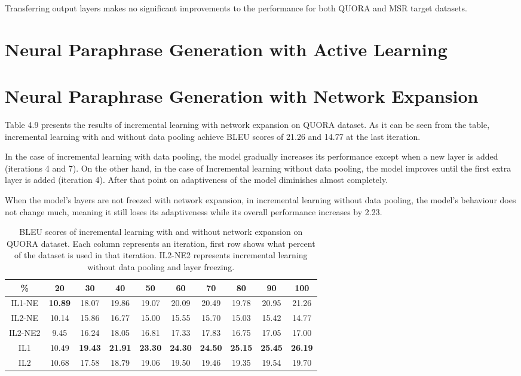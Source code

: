 Transferring output layers makes no significant improvements to the performance for both QUORA and MSR target datasets.


\section{Neural Paraphrase Generation with Active Learning}


\section{Neural Paraphrase Generation with Network Expansion}

Table 4.9 presents the results of incremental learning with network expansion on QUORA dataset. As it can be seen from the table, incremental learning with and without data pooling achieve BLEU scores of 21.26 and 14.77 at the last iteration.

In the case of incremental learning with data pooling, the model gradually increases its performance except when a new layer is added (iterations 4 and 7). On the other hand, in the case of Incremental learning without data pooling, the model improves until the first extra layer is added (iteration 4).  After that point on adaptiveness of the model diminishes almost completely.

When the model's layers are not freezed with network expansion, in incremental learning without data pooling, the model's behaviour does not change much, meaning it still loses its adaptiveness while its overall performance increases by 2.23.

\begin{table}[t]
\centering
\large
\begin{adjustbox}{width=1.2\textwidth,center=\textwidth} 
 \begin{tabular}{|c | c | c | c | c | c | c | c | c | c |} 
 \hline
 \% & 20 & 30 & 40 & 50 & 60 & 70 & 80 & 90 & 100 \\ [0.5ex] 
 \hline
  IL1-NE & \textbf{10.89} & 18.07 & 19.86 & 19.07 & 20.09 & 20.49 & 19.78 & 20.95 & 21.26  \\ 
 \hline
  IL2-NE & 10.14 & 15.86 & 16.77 & 15.00 & 15.55 & 15.70 & 15.03 & 15.42 & 14.77 \\ 
 \hline
  IL2-NE2 & 9.45 & 16.24 & 18.05 & 16.81 & 17.33 & 17.83 & 16.75 & 17.05 & 17.00 \\ 
 \hline
  IL1 & 10.49 &  \textbf{19.43} & \textbf{21.91} &  \textbf{23.30} &  \textbf{24.30} &  \textbf{24.50} &  \textbf{25.15} &  \textbf{25.45} &  \textbf{26.19}  \\ 
 \hline
  IL2 &  10.68 & 17.58 & 18.79 & 19.06 & 19.50 & 19.46 & 19.35 & 19.54 & 19.70 \\ 
 \hline
\end{tabular}
\end{adjustbox}
\caption{BLEU scores of incremental learning with and without network expansion on QUORA dataset. Each column represents an iteration, first row shows what percent of the dataset is used in that iteration. IL2-NE2 represents incremental learning without data pooling and layer freezing.}
\end{table}

